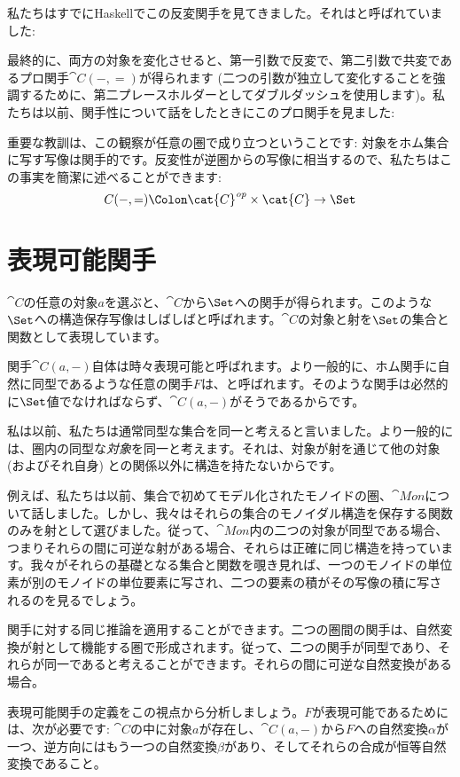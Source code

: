 私たちはすでにHaskellでこの反変関手を見てきました。それはと呼ばれていました: 


最終的に、両方の対象を変化させると、第一引数で反変で、第二引数で共変であるプロ関手$\cat{C}(-, =)$が得られます (二つの引数が独立して変化することを強調するために、第二プレースホルダーとしてダブルダッシュを使用します)。私たちは以前、関手性について話をしたときにこのプロ関手を見ました: 

重要な教訓は、この観察が任意の圏で成り立つということです: 対象をホム集合に写す写像は関手的です。反変性が逆圏からの写像に相当するので、私たちはこの事実を簡潔に述べることができます: 
\[C(-, =) \Colon \cat{C}^\mathit{op} \times \cat{C} \to \Set\]

\section{表現可能関手}

$\cat{C}$の任意の対象$a$を選ぶと、$\cat{C}$から$\Set$への関手が得られます。このような$\Set$への構造保存写像はしばしばと呼ばれます。$\cat{C}$の対象と射を$\Set$の集合と関数として表現しています。

関手$\cat{C}(a, -)$自体は時々表現可能と呼ばれます。より一般的に、ホム関手に自然に同型であるような任意の関手$F$は、と呼ばれます。そのような関手は必然的に$\Set$値でなければならず、$\cat{C}(a, -)$がそうであるからです。

私は以前、私たちは通常同型な集合を同一と考えると言いました。より一般的には、圏内の同型な\emph{対象}を同一と考えます。それは、対象が射を通じて他の対象 (およびそれ自身) との関係以外に構造を持たないからです。

例えば、私たちは以前、集合で初めてモデル化されたモノイドの圏、$\cat{Mon}$について話しました。しかし、我々はそれらの集合のモノイダル構造を保存する関数のみを射として選びました。従って、$\cat{Mon}$内の二つの対象が同型である場合、つまりそれらの間に可逆な射がある場合、それらは正確に同じ構造を持っています。我々がそれらの基礎となる集合と関数を覗き見れば、一つのモノイドの単位素が別のモノイドの単位要素に写され、二つの要素の積がその写像の積に写されるのを見るでしょう。

関手に対する同じ推論を適用することができます。二つの圏間の関手は、自然変換が射として機能する圏で形成されます。従って、二つの関手が同型であり、それらが同一であると考えることができます。それらの間に可逆な自然変換がある場合。

表現可能関手の定義をこの視点から分析しましょう。$F$が表現可能であるためには、次が必要です: $\cat{C}$の中に対象$a$が存在し、$\cat{C}(a, -)$から$F$への自然変換$\alpha$が一つ、逆方向にはもう一つの自然変換$\beta$があり、そしてそれらの合成が恒等自然変換であること。


